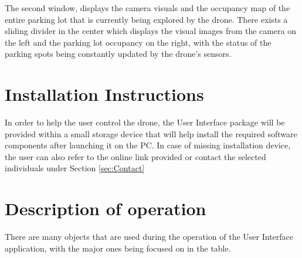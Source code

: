 \documentclass[12pt]{article}
\begin{document}
The second window, displays the camera visuals and the occupancy map of the entire parking lot that is currently being explored by the drone. There exists a sliding divider in the center which displays the visual images from the camera on the left and the parking lot occupancy on the right, with the status of the parking spots being constantly updated by the drone's sensors.

\section{Installation Instructions}

In order to help the user control the drone, the User Interface package will be provided within a small storage device that will help install the required software components after launching it on the PC. In case of missing installation device, the user can also refer to the online link provided or contact the selected individuals under Section \ref{sec:Contact}

\section{Description of operation}

There are many objects that are used during the operation of the User Interface application, with the major ones being focused on in the  table.
\end{document}

